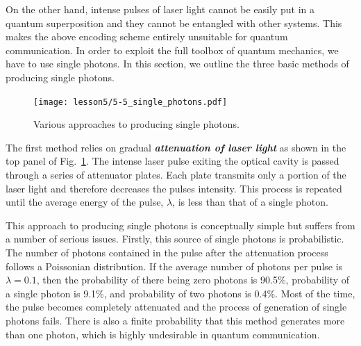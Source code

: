 On the other hand, intense pulses of laser light cannot be easily put in a quantum superposition and they cannot be entangled with other systems.
This makes the above encoding scheme entirely unsuitable for quantum communication.
In order to exploit the full toolbox of quantum mechanics, we have to use single photons.
In this section, we outline the three basic methods of producing single photons.

\begin{figure}
    \centering
    \texttt{[image: lesson5/5-5\_single\_photons.pdf]}
    \caption[Single photon sources.]{Various approaches to producing single photons.}
    \label{fig:5-5_single_photons}
\end{figure}

The first method relies on gradual \textbf{\emph{attenuation of laser light}} as shown in the top panel of Fig.~\ref{fig:5-5_single_photons}.
The intense laser pulse exiting the optical cavity is passed through a series of attenuator plates.
Each plate transmits only a portion of the laser light and therefore decreases the pulses intensity.
This process is repeated until the average energy of the pulse, $\lambda$, is less than that of a single photon.

This approach to producing single photons is conceptually simple but suffers from a number of serious issues.
Firstly, this source of single photons is probabilistic.
The number of photons contained in the pulse after the attenuation process follows a Poissonian distribution.
If the average number of photons per pulse is $\lambda = 0.1$, then the probability of there being zero photons is 90.5\%, probability of a single photon is 9.1\%, and probability of two photons is 0.4\%.
Most of the time, the pulse becomes completely attenuated and the process of generation of single photons fails.
There is also a finite probability that this method generates more than one photon, which is highly undesirable in quantum communication.

